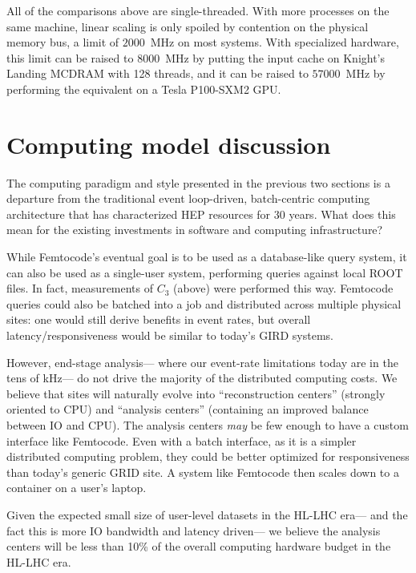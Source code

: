 \documentclass{article}
\begin{document}
All of the comparisons above are single-threaded. With more processes on the same machine, linear scaling is only spoiled by contention on the physical memory bus, a limit of $2000$~MHz on most systems. With specialized hardware\footnotemark, this limit can be raised to $8000$~MHz by putting the input cache on Knight's Landing MCDRAM with 128 threads, and it can be raised to $57000$~MHz by performing the equivalent on a Tesla P100-SXM2 GPU.


\section{Computing model discussion}

The computing paradigm and style presented in the previous two sections is a departure from the traditional event loop-driven, batch-centric computing architecture that has characterized HEP resources for 30 years.  What does this mean for the existing investments in software and computing infrastructure?

While Femtocode's eventual goal is to be used as a database-like query system, it can also be used as a single-user system, performing queries against local ROOT files. In fact, measurements of $C_3$ (above) were performed this way. Femtocode queries could also be batched into a job and distributed across multiple physical sites: one would still derive benefits in event rates, but overall latency/responsiveness would be similar to today's GIRD systems.

However, end-stage analysis--- where our event-rate limitations today are in the tens of kHz--- do not drive the majority of the distributed computing costs.  We believe that sites will naturally evolve into ``reconstruction centers'' (strongly oriented to CPU) and ``analysis centers'' (containing an improved balance between IO and CPU)\footnotemark.  The analysis centers {\it may} be few enough to have a custom interface like Femtocode.  Even with a batch interface, as it is a simpler distributed computing problem, they could be better optimized for responsiveness than today's generic GRID site.  A system like Femtocode then scales down to a container on a user's laptop.


Given the expected small size of user-level datasets in the HL-LHC era--- and the fact this is more IO bandwidth and latency driven--- we believe the analysis centers will be less than 10\% of the overall computing hardware budget in the HL-LHC era.
\end{document}
